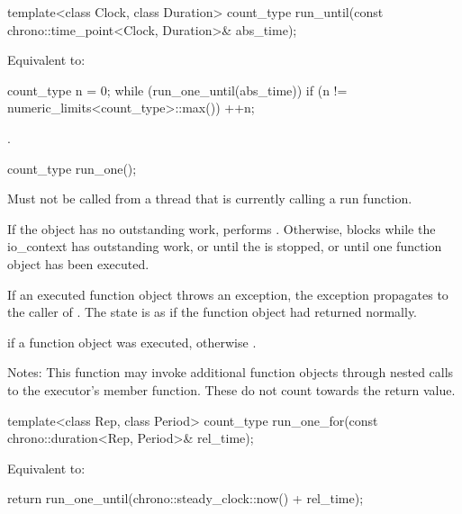 %
\begin{itemdecl}
template<class Clock, class Duration>
  count_type run_until(const chrono::time_point<Clock, Duration>& abs_time);
\end{itemdecl}

\begin{itemdescr}
\pnum
\effects Equivalent to: 
\begin{codeblock}
count_type n = 0;
while (run_one_until(abs_time))
  if (n != numeric_limits<count_type>::max())
    ++n;
\end{codeblock}


\pnum
\returns {}.
\end{itemdescr}

%
\begin{itemdecl}
count_type run_one();
\end{itemdecl}

\begin{itemdescr}
\pnum
\requires Must not be called from a thread that is currently calling a run function.

\pnum
\effects If the  object has no outstanding work, performs . Otherwise, blocks while the io_context has outstanding work, or until the  is stopped, or until one function object has been executed.

\pnum
If an executed function object throws an exception, the exception propagates to the caller of . The  state is as if the function object had returned normally.

\pnum
\returns {} if a function object was executed, otherwise .

\pnum
Notes: This function may invoke additional function objects through nested calls to the  executor's  member function. These do not count towards the return value.
\end{itemdescr}

%
\begin{itemdecl}
template<class Rep, class Period>
  count_type run_one_for(const chrono::duration<Rep, Period>& rel_time);
\end{itemdecl}

\begin{itemdescr}
\pnum
\effects Equivalent to: 
\begin{codeblock}
return run_one_until(chrono::steady_clock::now() + rel_time);
\end{codeblock}

\end{itemdescr}

